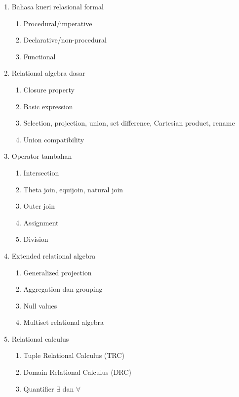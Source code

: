\begin{enumerate}
    \item \pwajib Bahasa kueri relasional formal
    \begin{enumerate}
        \item \pwajib Procedural/imperative
        \item \pwajib Declarative/non-procedural
        \item \ppaham Functional
    \end{enumerate}
    \item \pwajib Relational algebra dasar
    \begin{enumerate}
        \item \pwajib Closure property
        \item \pwajib Basic expression
        \item \pwajib Selection, projection, union, set difference, Cartesian product, rename
        \item \pwajib Union compatibility
    \end{enumerate}
    \item \pwajib Operator tambahan
    \begin{enumerate}
        \item \pwajib Intersection
        \item \pwajib Theta join, equijoin, natural join
        \item \pwajib Outer join
        \item \ppaham Assignment
        \item \pwajib Division
    \end{enumerate}
    \item \pwajib Extended relational algebra
    \begin{enumerate}
        \item \pwajib Generalized projection
        \item \pwajib Aggregation dan grouping
        \item \pwajib Null values
        \item \ppaham Multiset relational algebra
    \end{enumerate}
    \item \pwajib Relational calculus
    \begin{enumerate}
        \item \pwajib Tuple Relational Calculus (TRC)
        \item \pwajib Domain Relational Calculus (DRC)
        \item \pwajib Quantifier \(\exists\) dan \(\forall\)

\end{enumerate}
\end{enumerate}
